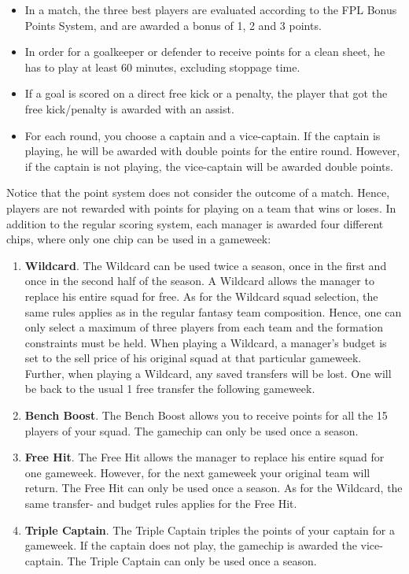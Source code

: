 \begin{itemize}
    \item In a match, the three best players are evaluated according to the FPL Bonus Points System, and are awarded a bonus of 1, 2 and 3 points. 
    \item In order for a goalkeeper or defender to receive points for a clean sheet, he has to play at least 60 minutes, excluding stoppage time. 
    \item If a goal is scored on a direct free kick or a penalty, the player that got the free kick/penalty is awarded with an assist. 
    \item For each round, you choose a captain and a vice-captain. If the captain is playing, he will be awarded with double points for the entire round. However, if the captain is not playing, the vice-captain will be awarded double points. 
\end{itemize}
Notice that the point system does not consider the outcome of a match. Hence, players are not rewarded with points for playing on a team that wins or loses. 
\newpar
In addition to the regular scoring system, each manager is awarded four different chips, where only one chip can be used in a gameweek: 
\begin{enumerate} [label=(\roman*)]

\item \textbf{Wildcard}. The Wildcard can be used twice a season, once in the first and once in the second half of the season. A Wildcard allows the manager to replace his entire squad for free. As for the Wildcard squad selection, the same rules applies as in the regular fantasy team composition. Hence, one can only select a maximum of three players from each team and the formation constraints must be held. When playing a Wildcard, a manager's budget is set to the sell price of his original squad at that particular gameweek. Further, when playing a Wildcard, any saved transfers will be lost. One will be back to the usual 1 free transfer the following gameweek.

\item \textbf{Bench Boost}. The Bench Boost allows you to receive points for all the 15 players of your squad. The gamechip can only be used once a season. 

\item \textbf{Free Hit}. The Free Hit allows the manager to replace his entire squad for one gameweek. However, for the next gameweek your original team will return.  The Free Hit can only be used once a season. As for the Wildcard, the same transfer- and budget rules applies for the Free Hit.

\item \textbf{Triple Captain}. The Triple Captain triples the points of your captain for a gameweek. If the captain does not play, the gamechip is awarded the vice-captain. The Triple Captain can only be used once a season. 
\end{enumerate}


